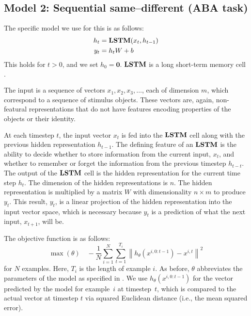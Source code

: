 \subsection{Model 2: Sequential same--different (ABA task)}\label{sec:model2}

The specific model we use for this is as follows:
%
\begin{align}
  h_{t} &= \textbf{LSTM}(x_{t}, h_{t-1}) \label{eq:lstm-recur-supp}\\
  y_{t} &= h_{t}W + b\label{eq:lstm-predict-supp}
\end{align}
%
This holds for $t > 0$, and we set $h_{0} = \mathbf{0}$. $\textbf{LSTM}$ is a long short-term memory cell \cite{hochreiter:1997}.

The input is a sequence of vectors $x_1, x_2, x_3, \dots$, each of dimension $m$, which correspond to a sequence of stimulus objects. These vectors are, again, non-featural representations that do not have features encoding properties of the objects or their identity.

At each timestep $t$, the input vector $x_t$ is fed into the $\textbf{LSTM}$ cell along with the previous hidden representation $h_{t-1}$. The defining feature of an $\textbf{LSTM}$ is the ability to decide whether to store information from the current input, $x_t$, and whether to remember or forget the information from the previous timestep $h_{t-t}$. The output of the $\textbf{LSTM}$ cell is the hidden representation for the current time step $h_t$. The dimension of the hidden representations is $n$. The hidden representation is multiplied by a matrix $W$ with dimensionality $n \times m$ to produce $y_t$. This result, $y_t$, is a linear projection of the hidden representation into the input vector space, which is necessary because $y_t$ is a prediction of what the next input, $x_{t+1}$, will be.

The objective function is as follows:
%
\begin{equation}
\max(\theta)
\quad
-\frac{1}{N}
\sum_{i=1}^{N}
\sum_{t=1}^{T_{i}}
\left\| h_{\theta}\left(x^{i, 0:{t-1}}\right) - x^{i,t} \right\|^{2}
\end{equation}
%
for $N$ examples. Here, $T_{i}$ is the length of example $i$. As before, $\theta$ abbreviates the parameters of the model as specified in . We use $h_{\theta}(x^{i, 0:{t-1}})$ for the vector predicted by the model for example~$i$ at timestep~$t$, which is compared to the actual vector at timestep $t$ via squared Euclidean distance (i.e., the mean squared error).

